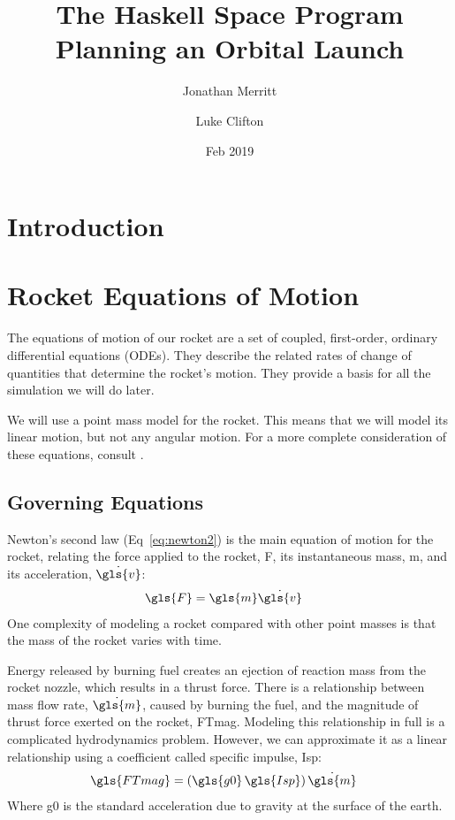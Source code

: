 \documentclass[12pt,openany]{book}
\title{
  The Haskell Space Program\\
  Planning an Orbital Launch
}
\author{
  Jonathan Merritt
  \and
  Luke Clifton
}
\date{Feb 2019}
\begin{document}
\maketitle
\tableofcontents

\chapter{Introduction}

\chapter{Rocket Equations of Motion}
\label{ch:rocket-eom}

The equations of motion of our rocket are a set of coupled, first-order, ordinary differential equations (ODEs). They describe the related rates of change of quantities that determine the rocket's motion. They provide a basis for all the simulation we will do later.

We will use a point mass model for the rocket. This means that we will model its linear motion, but not any angular motion. For a more complete consideration of these equations, consult \cite{gantmacher1950}.

\section{Governing Equations}

Newton's second law (Eq~\ref{eq:newton2}) is the main equation of motion for the rocket, relating the force applied to the rocket, \gls{F}, its instantaneous mass, \gls{m}, and its acceleration, $\dot{\gls{v}}$:
\begin{align}
  \gls{F} &= \gls{m} \dot{\gls{v}}  \label{eq:newton2}
\end{align}
One complexity of modeling a rocket compared with other point masses is that the mass of the rocket varies with time.

Energy released by burning fuel creates an ejection of reaction mass from the rocket nozzle, which results in a thrust force. There is a relationship between mass flow rate, $\dot{\gls{m}}$, caused by burning the fuel, and the magnitude of thrust force exerted on the rocket, \gls{FTmag}. Modeling this relationship in full is a complicated hydrodynamics problem. However, we can approximate it as a linear relationship using a coefficient called specific impulse, \gls{Isp}:
\begin{align}
  \gls{FTmag} &= \left( \gls{g0} \, \gls{Isp} \right) \dot{\gls{m}}
\end{align}
Where \gls{g0} is the standard acceleration due to gravity at the surface of the earth.
\end{document}
